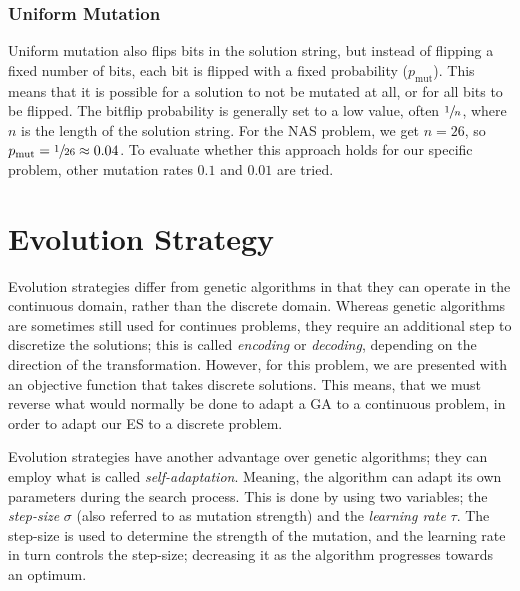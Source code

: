 \documentclass{article}
\begin{document}
\subsubsection*{Uniform Mutation}
\label{subsubsec:ga_mut_um}
\vspace{-0.2cm}
Uniform mutation also flips bits in the solution string, but instead of flipping a fixed number of bits, each bit is flipped with a fixed probability ($p_{\mathrm{mut}}$).
This means that it is possible for a solution to not be mutated at all, or for all bits to be flipped.
The bitflip probability is generally set to a low value, often $\sfrac{1}{n}$, where $n$ is the length of the solution string.
For the NAS problem, we get $n=26$, so $p_{\mathrm{mut}} = \sfrac{1}{26} \approx 0.04$.
To evaluate whether this approach holds for our specific problem, other mutation rates $0.1$ and $0.01$ are tried.



\section{Evolution Strategy}
\label{sec:ES}
Evolution strategies differ from genetic algorithms in that they can operate in the continuous domain, rather than the discrete domain.
Whereas genetic algorithms are sometimes still used for continues problems, they require an additional step to discretize the solutions; this is called \textit{encoding} or \textit{decoding}, depending on the direction of the transformation.
However, for this problem, we are presented with an objective function that takes discrete solutions.
This means, that we must reverse what would normally be done to adapt a GA to a continuous problem, in order to adapt our ES to a discrete problem.

Evolution strategies have another advantage over genetic algorithms; they can employ what is called \textit{self-adaptation}.
Meaning, the algorithm can adapt its own parameters during the search process.
This is done by using two variables; the \textit{step-size} $\sigma$ (also referred to as mutation strength) and the \textit{learning rate} $\tau$.
The step-size is used to determine the strength of the mutation, and the learning rate in turn controls the step-size; decreasing it as the algorithm progresses towards an optimum.
\end{document}
